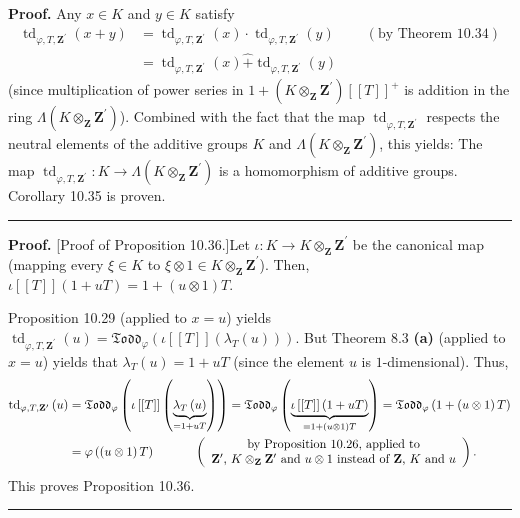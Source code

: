 \documentclass[numbers=enddot,12pt,final,onecolumn,notitlepage]{scrartcl}%
\newenvironment{proof}[1][Proof]{\noindent\textbf{#1.} }{\ \rule{0.5em}{0.5em}}
\begin{document}
\begin{proof}
Any $x\in K$ and $y\in K$ satisfy%
\begin{align*}
\operatorname*{td}\nolimits_{\varphi,T,\mathbf{Z}^{\prime}}\left(  x+y\right)
&  =\operatorname*{td}\nolimits_{\varphi,T,\mathbf{Z}^{\prime}}\left(
x\right)  \cdot\operatorname*{td}\nolimits_{\varphi,T,\mathbf{Z}^{\prime}%
}\left(  y\right)  \ \ \ \ \ \ \ \ \ \ \left(  \text{by Theorem 10.34}\right)
\\
&  =\operatorname*{td}\nolimits_{\varphi,T,\mathbf{Z}^{\prime}}\left(
x\right)  \widehat{+}\operatorname*{td}\nolimits_{\varphi,T,\mathbf{Z}%
^{\prime}}\left(  y\right)
\end{align*}
(since multiplication of power series in $1+\left(  K\otimes_{\mathbf{Z}%
}\mathbf{Z}^{\prime}\right)  \left[  \left[  T\right]  \right]  ^{+}$ is
addition in the ring $\Lambda\left(  K\otimes_{\mathbf{Z}}\mathbf{Z}^{\prime
}\right)  $). Combined with the fact that the map $\operatorname*{td}%
\nolimits_{\varphi,T,\mathbf{Z}^{\prime}}$ respects the neutral elements of
the additive groups $K$ and $\Lambda\left(  K\otimes_{\mathbf{Z}}%
\mathbf{Z}^{\prime}\right)  $, this yields: The map $\operatorname*{td}%
_{\varphi,T,\mathbf{Z}^{\prime}}:K\rightarrow\Lambda\left(  K\otimes
_{\mathbf{Z}}\mathbf{Z}^{\prime}\right)  $ is a homomorphism of additive
groups. Corollary 10.35 is proven.
\end{proof}

\begin{proof}
[Proof of Proposition 10.36.]Let $\iota:K\rightarrow K\otimes_{\mathbf{Z}%
}\mathbf{Z}^{\prime}$ be the canonical map (mapping every $\xi\in K$ to
$\xi\otimes1\in K\otimes_{\mathbf{Z}}\mathbf{Z}^{\prime}$). Then,
$\iota\left[  \left[  T\right]  \right]  \left(  1+uT\right)  =1+\left(
u\otimes1\right)  T$.

Proposition 10.29 (applied to $x=u$) yields $\operatorname*{td}_{\varphi
,T,\mathbf{Z}^{\prime}}\left(  u\right)  =\mathfrak{Todd}_{\varphi}\left(
\iota\left[  \left[  T\right]  \right]  \left(  \lambda_{T}\left(  u\right)
\right)  \right)  $. But Theorem 8.3 \textbf{(a)} (applied to $x=u$) yields
that $\lambda_{T}\left(  u\right)  =1+uT$ (since the element $u$ is
$1$-dimensional). Thus,%
\begin{align*}
\operatorname*{td}\nolimits_{\varphi,T,\mathbf{Z}^{\prime}}\left(  u\right)
&  =\mathfrak{Todd}_{\varphi}\left(  \iota\left[  \left[  T\right]  \right]
\left(  \underbrace{\lambda_{T}\left(  u\right)  }_{=1+uT}\right)  \right)
=\mathfrak{Todd}_{\varphi}\left(  \underbrace{\iota\left[  \left[  T\right]
\right]  \left(  1+uT\right)  }_{=1+\left(  u\otimes1\right)  T}\right)
=\mathfrak{Todd}_{\varphi}\left(  1+\left(  u\otimes1\right)  T\right) \\
&  =\varphi\left(  \left(  u\otimes1\right)  T\right)
\ \ \ \ \ \ \ \ \ \ \left(
\begin{array}
[c]{c}%
\text{by Proposition 10.26, applied to}\\
\mathbf{Z}^{\prime}\text{, }K\otimes_{\mathbf{Z}}\mathbf{Z}^{\prime}\text{ and
}u\otimes1\text{ instead of }\mathbf{Z}\text{, }K\text{ and }u
\end{array}
\right)  .
\end{align*}
This proves Proposition 10.36.
\end{proof}
\end{document}
